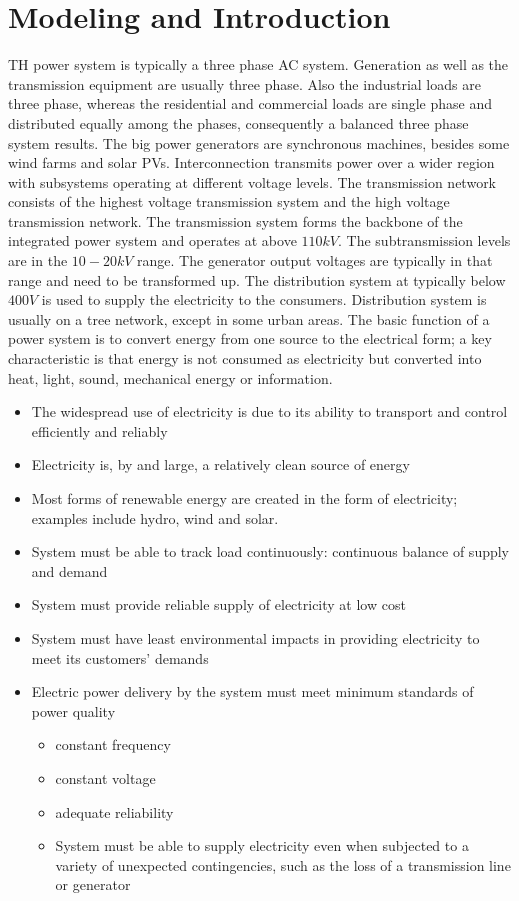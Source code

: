 \section{Modeling and Introduction}



TH power system is typically a three phase AC system. Generation as well as the transmission equipment are usually three phase. Also the industrial loads are three phase, whereas the residential and commercial loads are single phase and distributed equally among the phases, consequently a balanced three phase system results. The big power generators are synchronous machines, besides some wind farms and solar PVs. Interconnection transmits power over a wider region with subsystems operating at different voltage levels. The transmission network consists of the highest voltage transmission system and the high voltage transmission network. The transmission system forms the backbone of the integrated power system and operates at above $110kV$. The subtransmission levels are in the $10-20kV$ range.
The generator output voltages are typically in that range  and need to be transformed up. The distribution system at typically below $400V$ is used to supply the electricity
to the consumers. Distribution system is usually on a tree network, except in some urban areas.
The basic function of a power system is to convert energy from one source to the electrical form; a key characteristic is that energy is not consumed as electricity but converted into heat, light, sound, mechanical energy or information.

\begin{itemize}
\item The widespread use of electricity is due to its ability to transport and control efficiently and reliably
\item Electricity is, by and large, a relatively clean source of
energy
\item Most forms of renewable energy are created in the form of
electricity; examples include hydro, wind and solar.
\item System must be able to track load continuously: continuous balance of supply and demand
\item System must provide reliable supply of electricity at low cost
\item System must have least environmental impacts in providing electricity to meet its customers’ demands
\item Electric power delivery by the system must meet
minimum standards of power quality
\begin{itemize}
\item constant frequency
\item constant voltage
\item adequate reliability
\item System must be able to supply electricity even when subjected to a variety of unexpected contingencies, such as the loss of a transmission line or generator
\end{itemize}
\end{itemize}

